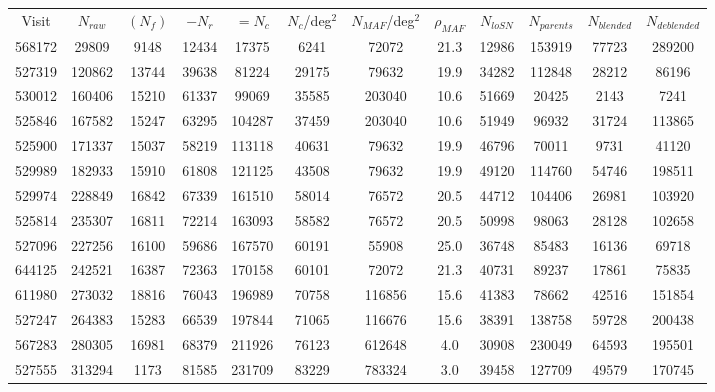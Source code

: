 \documentclass[DM,lsstdraft,toc,usenatbib]{lsstdoc}
\begin{document}
\begin{landscape}
\begin{longtable}{cccccccccccc}
Visit & $N_{raw}$ & $(N_{f})$ & $-N_{r}$ & $=N_{c}$ & $N_{c}$/deg$^{2}$ & $N_{MAF}$/deg$^{2}$ & $\rho_{MAF}$ & $N_{loSN}$ & $N_{parents}$ & $N_{blended}$ & $N_{deblended}$ \\
568172 & 29809 & 9148 & 12434 & 17375 & 6241 & 72072 & 21.3 & 12986 & 153919 & 77723 & 289200 \\
527319 & 120862 & 13744 & 39638 & 81224 & 29175 & 79632 & 19.9 & 34282 & 112848 & 28212 & 86196 \\
530012 & 160406 & 15210 & 61337 & 99069 & 35585 & 203040 & 10.6 & 51669 & 20425 & 2143 & 7241 \\
525846 & 167582 & 15247 & 63295 & 104287 & 37459 & 203040 & 10.6 & 51949 & 96932 & 31724 & 113865 \\
525900 & 171337 & 15037 & 58219 & 113118 & 40631 & 79632 & 19.9 & 46796 & 70011 & 9731 & 41120 \\
529989 & 182933 & 15910 & 61808 & 121125 & 43508 & 79632 & 19.9 & 49120 & 114760 & 54746 & 198511 \\
529974 & 228849 & 16842 & 67339 & 161510 & 58014 & 76572 & 20.5 & 44712 & 104406 & 26981 & 103920 \\
525814 & 235307 & 16811 & 72214 & 163093 & 58582 & 76572 & 20.5 & 50998 & 98063 & 28128 & 102658 \\
527096 & 227256 & 16100 & 59686 & 167570 & 60191 & 55908 & 25.0 & 36748 & 85483 & 16136 & 69718 \\
644125 & 242521 & 16387 & 72363 & 170158 & 60101 & 72072 & 21.3 & 40731 & 89237 & 17861 & 75835 \\
611980 & 273032 & 18816 & 76043 & 196989 & 70758 & 116856 & 15.6 & 41383 & 78662 & 42516 & 151854 \\
527247 & 264383 & 15283 & 66539 & 197844 & 71065 & 116676 & 15.6 & 38391 & 138758 & 59728 & 200438 \\
567283 & 280305 & 16981 & 68379 & 211926 & 76123 & 612648 & 4.0 & 30908 & 230049 & 64593 & 195501 \\
527555 & 313294 & 1173 & 81585 & 231709 & 83229 & 783324 & 3.0 & 39458 & 127709 & 49579 & 170745 \\

\end{longtable}
\end{landscape}
\end{document}
